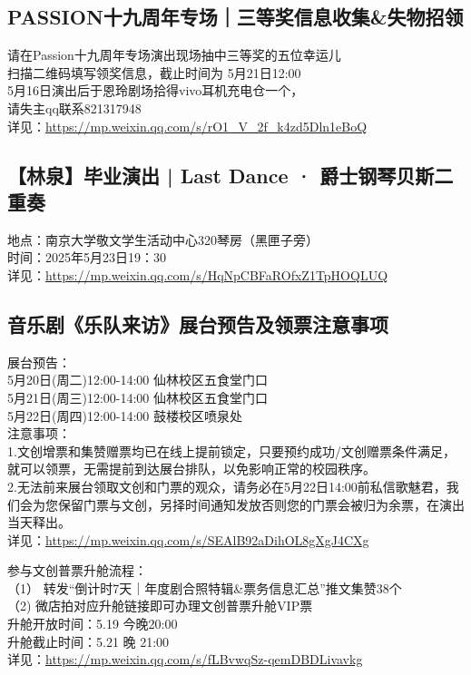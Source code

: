 \documentclass[letterpaper, 12pt]{article}
\begin{document}
\begin{multicols}{2}
\subsection{PASSION十九周年专场｜三等奖信息收集\&失物招领} %
请在Passion十九周年专场演出现场抽中三等奖的五位幸运儿
\\扫描二维码填写领奖信息，截止时间为 5月21日12:00
\\5月16日演出后于恩玲剧场拾得vivo耳机充电仓一个，
\\请失主qq联系821317948
\\详见：\url{https://mp.weixin.qq.com/s/rO1_V_2f_k4zd5Dln1eBoQ}

\subsection{【林泉】毕业演出 | Last Dance · 爵士钢琴贝斯二重奏} %
地点：南京大学敬文学生活动中心320琴房（黑匣子旁）
\\时间：2025年5月23日19：30
\\详见：\url{https://mp.weixin.qq.com/s/HqNpCBFaROfxZ1TpHOQLUQ}


\subsection{音乐剧《乐队来访》展台预告及领票注意事项} %
展台预告：
\\5月20日(周二)12:00-14:00 仙林校区五食堂门口
\\5月21日(周三)12:00-14:00 仙林校区五食堂门口
\\5月22日(周四)12:00-14:00 鼓楼校区喷泉处
\\注意事项：
\\1.文创增票和集赞赠票均已在线上提前锁定，只要预约成功/文创赠票条件满足，就可以领票，无需提前到达展台排队，以免影响正常的校园秩序。
\\2.无法前来展台领取文创和门票的观众，请务必在5月22日14:00前私信歌魅君，我们会为您保留门票与文创，另择时间通知发放否则您的门票会被归为余票，在演出当天释出。
\\详见：\url{https://mp.weixin.qq.com/s/SEAlB92aDihOL8gXgJ4CXg}

参与文创普票升舱流程：
\\（1） 转发“倒计时7天｜年度剧合照特辑\&票务信息汇总”推文集赞38个
\\（2) 微店拍对应升舱链接即可办理文创普票升舱VIP票
\\升舱开放时间：5.19 今晚20:00
\\升舱截止时间：5.21 晚 21:00
\\详见：\url{https://mp.weixin.qq.com/s/fLBvwqSz-qemDBDLivavkg}

\end{multicols}
\end{document}
